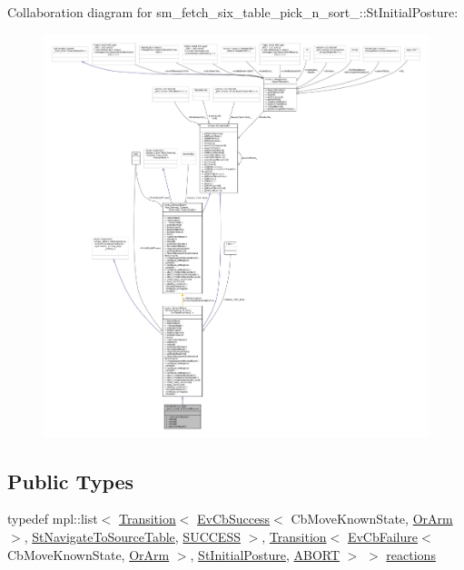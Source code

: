 Collaboration diagram for sm\+\_\+fetch\+\_\+six\+\_\+table\+\_\+pick\+\_\+n\+\_\+sort\+\_\+:\+:St\+Initial\+Posture\+:
\nopagebreak
\begin{figure}[H]
\begin{center}
\leavevmode
\includegraphics[width=350pt]{structsm__fetch__six__table__pick__n__sort__1_1_1StInitialPosture__coll__graph}
\end{center}
\end{figure}
\subsection*{Public Types}
\begin{DoxyCompactItemize}
\item 
typedef mpl\+::list$<$ \hyperlink{classsmacc_1_1Transition}{Transition}$<$ \hyperlink{structsmacc_1_1EvCbSuccess}{Ev\+Cb\+Success}$<$ Cb\+Move\+Known\+State, \hyperlink{classsm__fetch__six__table__pick__n__sort__1_1_1OrArm}{Or\+Arm} $>$, \hyperlink{structsm__fetch__six__table__pick__n__sort__1_1_1StNavigateToSourceTable}{St\+Navigate\+To\+Source\+Table}, \hyperlink{structsmacc_1_1default__transition__tags_1_1SUCCESS}{S\+U\+C\+C\+E\+SS} $>$, \hyperlink{classsmacc_1_1Transition}{Transition}$<$ \hyperlink{structsmacc_1_1EvCbFailure}{Ev\+Cb\+Failure}$<$ Cb\+Move\+Known\+State, \hyperlink{classsm__fetch__six__table__pick__n__sort__1_1_1OrArm}{Or\+Arm} $>$, \hyperlink{structsm__fetch__six__table__pick__n__sort__1_1_1StInitialPosture}{St\+Initial\+Posture}, \hyperlink{structsmacc_1_1default__transition__tags_1_1ABORT}{A\+B\+O\+RT} $>$ $>$ \hyperlink{structsm__fetch__six__table__pick__n__sort__1_1_1StInitialPosture_a5b37238100acae9e9da76c09cf50fab6}{reactions}
\end{DoxyCompactItemize}
